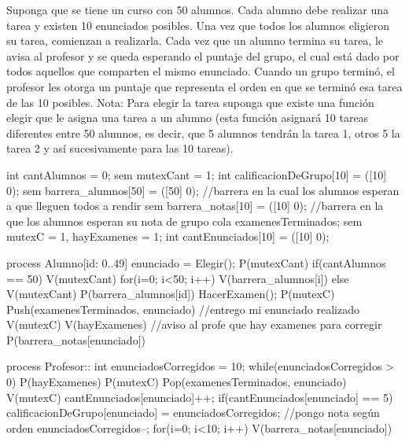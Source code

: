 Suponga que se tiene un curso con 50 alumnos. Cada alumno debe realizar una tarea y
existen 10 enunciados posibles. Una vez que todos los alumnos eligieron su tarea,
comienzan a realizarla. Cada vez que un alumno termina su tarea, le avisa al profesor y se
queda esperando el puntaje del grupo, el cual está dado por todos aquellos que comparten
el mismo enunciado. Cuando un grupo terminó, el profesor les otorga un puntaje que
representa el orden en que se terminó esa tarea de las 10 posibles.
    Nota: Para elegir la tarea suponga que existe una función
    elegir que le asigna una tarea a un alumno (esta función asignará 10 tareas diferentes entre 50 alumnos, es decir, que 5
    alumnos tendrán la tarea 1, otros 5 la tarea 2 y así sucesivamente para las 10 tareas).

int cantAlumnos = 0;
sem mutexCant = 1;
int calificacionDeGrupo[10] = ([10] 0);
sem barrera_alumnos[50] = ([50] 0); //barrera en la cual los alumnos esperan a que lleguen todos a rendir
sem barrera_notas[10] = ([10] 0); //barrera en la que los alumnos esperan su nota de grupo
cola examenesTerminados;
sem mutexC = 1, hayExamenes = 1;
int cantEnunciados[10] = ([10] 0);

process Alumno[id: 0..49]
{
    enunciado = Elegir();
    P(mutexCant)
    if(cantAlumnos == 50){
        V(mutexCant)
        for(i=0; i<50; i++) V(barrera_alumnos[i])
    } else {
        V(mutexCant)
        P(barrera_alumnos[id])
    }
    HacerExamen();
    P(mutexC)
    Push(examenesTerminados, enunciado) //entrego mi enunciado realizado
    V(mutexC)
    V(hayExamenes) //aviso al profe que hay examenes para corregir
    P(barrera_notas[enunciado])
}

process Profesor::
{
    int enunciadosCorregidos = 10;
    while(enunciadosCorregidos > 0)
    {
        P(hayExamenes)    
        P(mutexC)
        Pop(examenesTerminados, enunciado)
        V(mutexC)
        cantEnunciados[enunciado]++;
        if(cantEnunciados[enunciado] == 5)
        {
            calificacionDeGrupo[enunciado] = enunciadosCorregidos; //pongo nota según orden
            enunciadosCorregidos--;
            for(i=0; i<10; i++) V(barrera_notas[enunciado])
        }
    }
}
